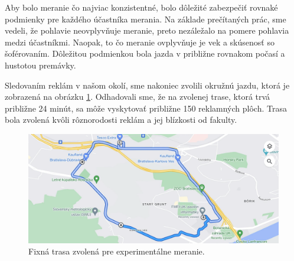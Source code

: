
Aby bolo meranie čo najviac konzistentné, bolo dôležité zabezpečiť rovnaké podmienky pre každého účastníka merania. Na základe prečítaných prác, %
sme vedeli, že pohlavie neovplyvňuje meranie, preto nezáležalo na pomere pohlavia medzi účastníkmi. Naopak, to čo meranie ovplyvňuje je vek a skúsenosť so šoférovaním. Dôležitou podmienkou bola jazda v približne rovnakom počasí a hustotou premávky. 

Sledovaním reklám v našom okolí, sme nakoniec zvolili okružnú jazdu, ktorá je zobrazená na obrázku \ref{img:road}. Odhadovali sme, že na zvolenej trase, ktorá trvá približne 24 minút, sa môže vyskytovať približne 150 reklamných plôch. Trasa bola zvolená kvôli rôznorodosti reklám a jej blízkosti od fakulty.
\\
\begin{figure}[ht]
    \centering
    \includegraphics[width=1\textwidth]{images/02/map.png}
    \caption{Fixná trasa zvolená pre experimentálne meranie.}
    \label{img:road}
\end{figure}


